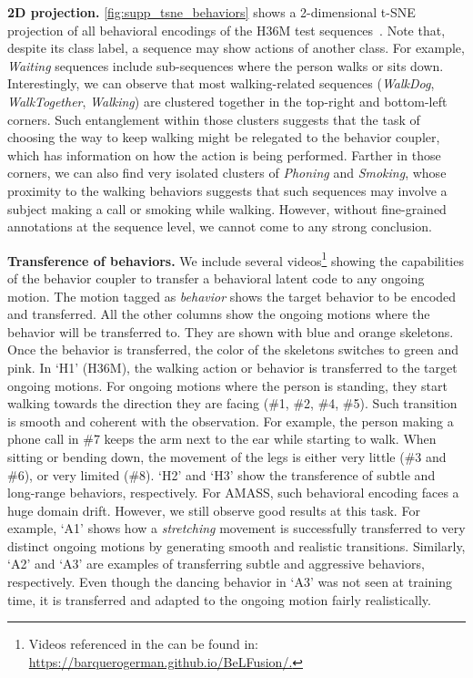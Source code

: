 \documentclass[10pt,twocolumn,letterpaper]{article}
\begin{document}
\textbf{2D projection. }\autoref{fig:supp_tsne_behaviors} shows a 2-dimensional t-SNE projection of all behavioral encodings of the H36M test sequences~\cite{van2008tsne}. Note that, despite its class label, a sequence may show actions of another class. For example, \textit{Waiting} sequences include sub-sequences where the person walks or sits down. Interestingly, we can observe that most walking-related sequences (\textit{WalkDog}, \textit{WalkTogether}, \textit{Walking}) are clustered together in the top-right and bottom-left corners. Such entanglement within those clusters suggests that the task of choosing the way to keep walking might be relegated to the behavior coupler, which has information on how the action is being performed. Farther in those corners, we can also find very isolated clusters of \textit{Phoning} and \textit{Smoking}, whose proximity to the walking behaviors suggests that such sequences may involve a subject making a call or smoking while walking. However, without fine-grained annotations at the sequence level, we cannot come to any strong conclusion.




\textbf{Transference of behaviors. }We include several videos\footnote{Videos referenced in the \supp{} can be found in: \small\url{https://barquerogerman.github.io/BeLFusion/.}} showing the capabilities of the behavior coupler to transfer a behavioral latent code to any ongoing motion. The motion tagged as \textit{behavior} shows the target behavior to be encoded and transferred. All the other columns show the ongoing motions where the behavior will be transferred to. They are shown with blue and orange skeletons. Once the behavior is transferred, the color of the skeletons switches to green and pink. In `H1' (H36M), the walking action or behavior is transferred to the target ongoing motions. For ongoing motions where the person is standing, they start walking towards the direction they are facing (\#1, \#2, \#4, \#5). Such transition is smooth and coherent with the observation. For example, the person making a phone call in \#7 keeps the arm next to the ear while starting to walk. When sitting or bending down, the movement of the legs is either very little (\#3 and \#6), or very limited (\#8). `H2' and `H3' show the transference of subtle and long-range behaviors, respectively. For AMASS, such behavioral encoding faces a huge domain drift. However, we still observe good results at this task. For example, `A1' shows how a \textit{stretching} movement is successfully transferred to very distinct ongoing motions by generating smooth and realistic transitions. Similarly, `A2' and `A3' are examples of transferring subtle and aggressive behaviors, respectively. Even though the dancing behavior in `A3' was not seen at training time, it is transferred and adapted to the ongoing motion fairly realistically.
\end{document}
